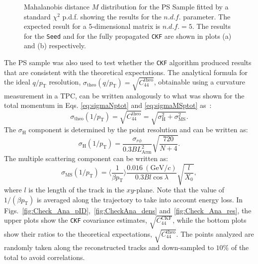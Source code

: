 \begin{figure}[!ht]
\begin{subfigure}[b]{0.48\textwidth}
         \caption{}
         \label{fig:chi2Kalman}
     \end{subfigure}
        \caption[Mahalanobis distance $M$ distribution for the PS Sample.]{Mahalanobis distance $M$ distribution for the PS Sample fitted by a standard $\chi^2$ p.d.f. showing the results for the $n.d.f.$ parameter. The expected result for a 5-dimensional matrix is $n.d.f. = 5$. The results for the \texttt{Seed} and for the fully propagated \texttt{CKF} are shown in plots (a) and (b) respectively. } \label{fig:chi2}
\end{figure}


The PS sample was also used to test whether the \texttt{CKF} algorithm produced results that are consistent with the theoretical expectations. The analytical formula for the ideal $q/p_{\text{T}}$ resolution, $\sigma_{\text{theo}}(q/p_{\text{T}})=\sqrt{C_{44}^{\textrm{theo}}}$, obtainable using a curvature measurement in a TPC, can be written analogously to what was shown for the total momentum in Eqs. \ref{eq:sigmaNptot} and \ref{eq:sigmaMSptot} as~\cite{PDG:34,Gluckstern:1963}:
\begin{equation}
   \sigma_{\text{theo}}(1/p_{\text{T}}) = \sqrt{C_{44}^{\textrm{theo}}} = \sqrt{\sigma_{\text{H}}^2+\sigma_{\text{MS}}^2}.
\end{equation}
The $\sigma_{\text{H}}$ component is determined by the point resolution and can be written as:
\begin{equation}\label{eq:sigmaN}
    \sigma_{\text{H}}(1/p_{\text{T}})=\frac{\sigma_{r\phi}}{0.3BL_{\textrm{Arm}}^2}\sqrt{\frac{720}{N+4}}.
\end{equation} 
The multiple scattering component can be written as:
\begin{equation}\label{eq:sigmaMS}
    \sigma_{\text{MS}}(1/p_{\text{T}})=\bigg\langle\frac{1}{\beta p_{\text{T}}}\bigg\rangle\frac{0.016 \ (\textrm{GeV}/c)}{0.3 B l\cos\lambda}\sqrt{\frac{l}{X_0}},
\end{equation}
where $l$ is the length of the track in the $xy$-plane. 
Note that the value of $1/\left(\beta p_{\text{T}}\right)$ is averaged along the trajectory to take into account energy loss. In Figs.~\ref{fig:Check_Ana_pID},~\ref{fig:CheckAna_dens} and~\ref{fig:Check_Ana_res},  the upper plots show the \texttt{CKF} covariance estimates, $\sqrt{C_{44}^{\textrm{CKF}}}$, while the bottom plots show their ratios to the theoretical expectations, $\sqrt{C_{44}^{\textrm{theo}}}$. The points analyzed are randomly taken along the reconstructed tracks and down-sampled to $10\%$ of the total to avoid correlations.

